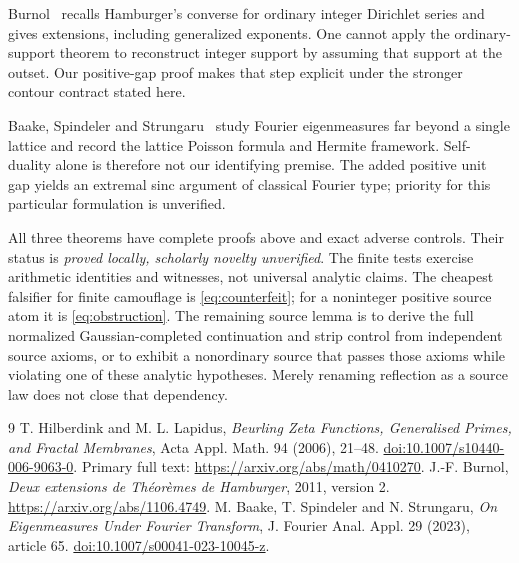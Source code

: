 \documentclass[11pt]{article}
\theoremstyle{remark}\newtheorem{remark}[theorem]{Remark}
\begin{document}
Burnol~\cite{Burnol} recalls Hamburger's converse for ordinary integer
Dirichlet series and gives extensions, including generalized exponents.
One cannot apply the ordinary-support theorem to reconstruct integer
support by assuming that support at the outset. Our positive-gap proof
makes that step explicit under the stronger contour contract stated here.

Baake, Spindeler and Strungaru~\cite{BSS} study Fourier eigenmeasures far
beyond a single lattice and record the lattice Poisson formula and Hermite
framework. Self-duality alone is therefore not our identifying premise.
The added positive unit gap yields an extremal sinc argument of classical
Fourier type; priority for this particular formulation is unverified.

All three theorems have complete proofs above and exact adverse controls.
Their status is \emph{proved locally, scholarly novelty unverified}. The
finite tests exercise arithmetic identities and witnesses, not universal
analytic claims. The cheapest falsifier for finite camouflage is
\eqref{eq:counterfeit}; for a noninteger positive source atom it is
\eqref{eq:obstruction}. The remaining source lemma is to derive the
full normalized Gaussian-completed continuation and strip control from
independent source axioms, or to exhibit a nonordinary source that passes
those axioms while violating one of these analytic hypotheses. Merely
renaming reflection as a source law does not close that dependency.

\begin{thebibliography}{9}
 T. Hilberdink and M. L. Lapidus,
\emph{Beurling Zeta Functions, Generalised Primes, and Fractal Membranes},
Acta Appl. Math. 94 (2006), 21--48.
\href{https://doi.org/10.1007/s10440-006-9063-0}{doi:10.1007/s10440-006-9063-0}.
Primary full text: \url{https://arxiv.org/abs/math/0410270}.
 J.-F. Burnol,
\emph{Deux extensions de Th\'eor\`emes de Hamburger}, 2011, version 2.
\url{https://arxiv.org/abs/1106.4749}.
 M. Baake, T. Spindeler and N. Strungaru,
\emph{On Eigenmeasures Under Fourier Transform},
J. Fourier Anal. Appl. 29 (2023), article 65.
\href{https://doi.org/10.1007/s00041-023-10045-z}{doi:10.1007/s00041-023-10045-z}.
\end{thebibliography}
\end{document}
